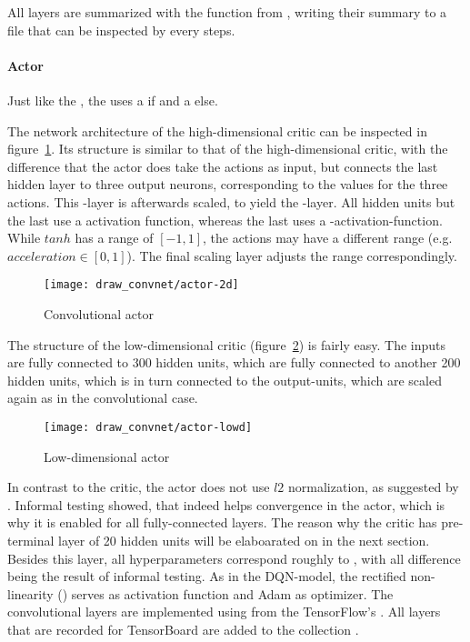 All layers are summarized with the function  from , writing their summary to a file that can be inspected by  every  steps. 


\paragraph{Actor}

Just like the , the  uses a  if  and a  else.

The network architecture of the high-dimensional critic can be inspected in figure~\ref{fig:2dact}. Its structure is similar to that of the high-dimensional critic, with the difference that the actor does take the actions as input, but connects the last hidden layer to three output neurons, corresponding to the values for the three actions. This -layer is afterwards scaled, to yield the -layer. All hidden units but the last use a  activation function, whereas the last uses a -activation-function. While $tanh$ has a range of $[-1,1]$, the actions may have a different range (e.g. $acceleration \in [0,1]$). The final scaling layer adjusts the range correspondingly.

\begin{figure}[h]
	\centering 
	\texttt{[image: draw\_convnet/actor-2d]}
	\caption{Convolutional actor}
	\label{fig:2dact}
\end{figure}

The structure of the low-dimensional critic (figure~\ref{fig:lowdact}) is fairly easy. The inputs are fully connected to 300 hidden units, which are fully connected to another 200 hidden units, which is in turn connected to the output-units, which are scaled again as in the convolutional case. 

\begin{figure}[h]
	\centering 
	\texttt{[image: draw\_convnet/actor-lowd]}
	\caption{Low-dimensional actor}
	\label{fig:lowdact}
\end{figure}

In contrast to the critic, the actor does not use $l2$ normalization, as suggested by \cite{lillicrap_continuous_2015}. Informal testing showed, that \batchnorm indeed helps convergence in the actor, which is why it is enabled for all fully-connected layers. The reason why the critic has pre-terminal layer of 20 hidden units will be elaboarated on in the next section. Besides this layer, all hyperparameters correspond roughly to \cite{lillicrap_continuous_2015}, with all difference being the result of informal testing. As in the DQN-model, the rectified non-linearity () serves as activation function and Adam\cite{kingma_adam:_2014} as optimizer. The convolutional layers are implemented using  from the TensorFlow's . All layers that are recorded for TensorBoard are added to the collection .

